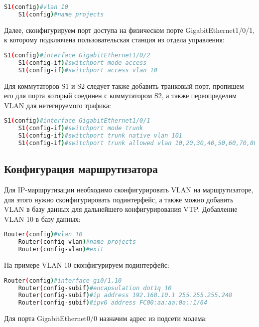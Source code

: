 \begin{lstlisting}[language=sh]
    S1(config)#vlan 10
    S1(config)#name projects
\end{lstlisting}

Далее, сконфигурируем порт доступа на физическом порте GigabitEthernet1/0/1, к которому подключена пользовательская
станция из отдела управления:

\begin{lstlisting}[language=sh]
    S1(config)#interface GigabitEthernet1/0/2
    S1(config-if)#switchport mode access
    S1(config-if)#switchport access vlan 10
\end{lstlisting}

Для коммутаторов S1 и S2 следует также добавить транковый порт, пропишем его для порта который соединен с коммутатором S2,
а также переопределим VLAN для нетегируемого трафика:

\begin{lstlisting}[language=sh]
    S1(config)#interface GigabitEthernet1/0/1
    S1(config-if)#switchport mode trunk
    S1(config-if)#switchport trunk native vlan 101
    S1(config-if)#switchport trunk allowed vlan 10,20,30,40,50,60,70,80,100,101
\end{lstlisting}

\subsection{Конфигурация маршрутизатора}

Для IP-маршрутизации необходимо сконфигурировать VLAN на маршрутизаторе, для этого нужно сконфигурировать
подинтерфейс, а также можно добавить VLAN в базу данных для дальнейшего конфигурирования VTP.
Добавление VLAN 10 в базу данных:
\begin{lstlisting}[language=sh]
    Router(config)#vlan 10
    Router(config-vlan)#name projects
    Router(config-vlan)#exit
\end{lstlisting}

На примере VLAN 10 сконфигурируем подинтерфейс:

\begin{lstlisting}[language=sh]
    Router(config)#interface gi0/1.10
    Router(config-subif)#encapsulation dot1q 10
    Router(config-subif)#ip address 192.168.10.1 255.255.255.248
    Router(config-subif)#ipv6 address FC00:aa:aa:0a::1/64
\end{lstlisting}

Для порта GigabitEthernet0/0 назначим адрес из подсети модема:

